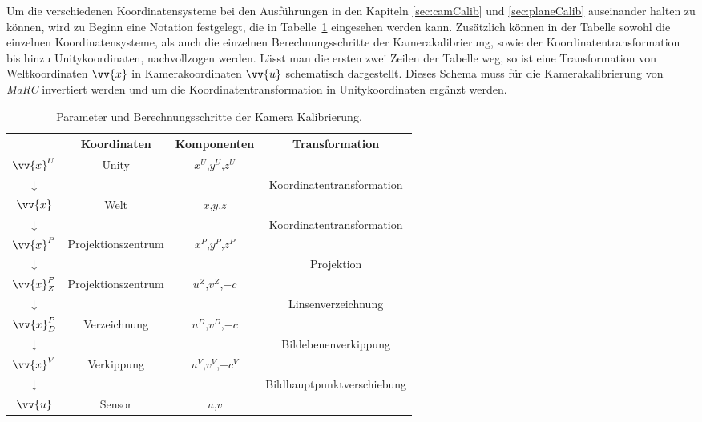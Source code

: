 Um die verschiedenen Koordinatensysteme bei den Ausführungen in den Kapiteln \ref{sec:camCalib} und \ref{sec:planeCalib} auseinander halten zu können, wird zu Beginn eine Notation festgelegt, die in Tabelle~\ref{tab:camCalibParam} eingesehen werden kann. Zusätzlich können in der Tabelle sowohl die einzelnen Koordinatensysteme, als auch die einzelnen Berechnungsschritte der Kamerakalibrierung, sowie der Koordinatentransformation bis hinzu Unitykoordinaten, nachvollzogen werden. Lässt man die ersten zwei Zeilen der Tabelle weg, so ist eine Transformation von Weltkoordinaten $\vv{x}$ in Kamerakoordinaten $\vv{u}$ schematisch dargestellt. Dieses Schema muss für die Kamerakalibrierung von \textit{MaRC} invertiert werden und um die Koordinatentransformation in Unitykoordinaten ergänzt werden.\\

\begin{table}
	\centering
	\renewcommand{\arraystretch}{1.4}
	\begin{tabular}{|c|c|c|c|}
		\hline
		\Absatzbox{}
		& \textbf{Koordinaten} & \textbf{Komponenten}&\textbf{Transformation}\\
		\hline
		$\vv{x}^U$ & Unity &$x^U$,$y^U$,$z^U$& \\
		\cline{2-4}
		$\downarrow$ & & & Koordinatentransformation\\
		\cline{2-4}
		$\vv{x}$ & Welt &$x$,$y$,$z$&  \\
		\cline{2-4}
		$\downarrow$ & & & Koordinatentransformation\\
		\cline{2-4}
		$\vv{x}^P$ & Projektionszentrum &$x^P$,$y^P$,$z^P$& \\
		\cline{2-4}
		$\downarrow$ & & & Projektion \\
		\cline{2-4}
		$\vv{x}^P_Z$ & Projektionszentrum &$u^Z$,$v^Z$,$-c$& \\
		\cline{2-4}
		$\downarrow$ & & & Linsenverzeichnung\\
		\cline{2-4}	
		$\vv{x}^P_D$ & Verzeichnung &$u^D$,$v^D$,$-c$& \\
		\cline{2-4}
		$\downarrow$ & & & Bildebenenverkippung\\
		\cline{2-4}		
		$\vv{x}^V$ &Verkippung &$u^V$,$v^V$,$-c^V$& \\
		\cline{2-4}
		$\downarrow$ & & & Bildhauptpunktverschiebung\\
		\cline{2-4}	
		$\vv{u}$ & Sensor &$u$,$v$ & \\
		\hline
	\end{tabular}
	\caption{Parameter und Berechnungsschritte der Kamera Kalibrierung.\cite{Meisel:77890}}
	\label{tab:camCalibParam}
\end{table}


